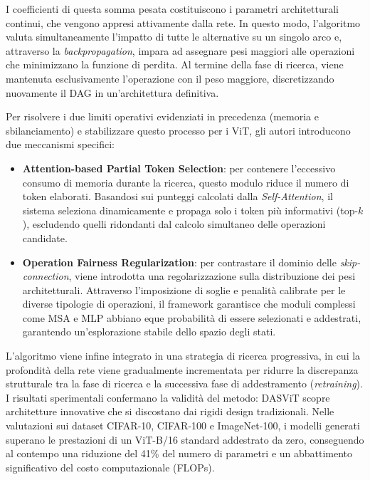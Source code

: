 I coefficienti di questa somma pesata costituiscono i parametri architetturali
continui, che vengono appresi attivamente dalla rete. In questo modo,
l'algoritmo valuta simultaneamente l'impatto di tutte le alternative su un
singolo arco e, attraverso la \textit{backpropagation}, impara ad assegnare
pesi maggiori alle operazioni che minimizzano la funzione di perdita. Al
termine della fase di ricerca, viene mantenuta esclusivamente l'operazione con
il peso maggiore, discretizzando nuovamente il DAG in un'architettura
definitiva.

Per risolvere i due limiti operativi evidenziati in precedenza (memoria e
sbilanciamento) e stabilizzare questo processo per i ViT, gli autori
introducono due meccanismi specifici:
\begin{itemize}
    \item \textbf{Attention-based Partial Token Selection}: per contenere l'eccessivo consumo di memoria durante la ricerca, questo modulo riduce il numero di token elaborati. Basandosi sui punteggi calcolati dalla \textit{Self-Attention}, il sistema seleziona dinamicamente e propaga solo i token più informativi (top-$k$), escludendo quelli ridondanti dal calcolo simultaneo delle operazioni candidate.
    \item \textbf{Operation Fairness Regularization}: per contrastare il dominio delle \textit{skip-connection}, viene introdotta una regolarizzazione sulla distribuzione dei pesi architetturali. Attraverso l'imposizione di soglie e penalità calibrate per le diverse tipologie di operazioni, il framework garantisce che moduli complessi come MSA e MLP abbiano eque probabilità di essere selezionati e addestrati, garantendo un'esplorazione stabile dello spazio degli stati.
\end{itemize}

L'algoritmo viene infine integrato in una strategia di ricerca progressiva, in
cui la profondità della rete viene gradualmente incrementata per ridurre la
discrepanza strutturale tra la fase di ricerca e la successiva fase di
addestramento (\textit{retraining}). I risultati sperimentali confermano la
validità del metodo: DASViT scopre architetture innovative che si discostano
dai rigidi design tradizionali. Nelle valutazioni sui dataset CIFAR-10,
CIFAR-100 e ImageNet-100, i modelli generati superano le prestazioni di un
ViT-B/16 standard addestrato da zero, conseguendo al contempo una riduzione del
41\% del numero di parametri e un abbattimento significativo del costo
computazionale (FLOPs).

